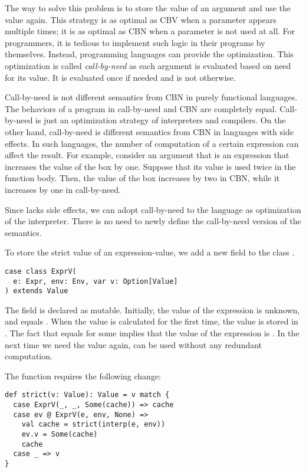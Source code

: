 The way to solve this problem is to store the value of an argument and use the
value again. This strategy is as optimal as CBV when a parameter appears
multiple times; it is as optimal as CBN when a parameter is not used at all.
For programmers, it is tedious to implement such logic in their programs by
themselves. Instead, programming languages can provide the optimization. This
optimization is called \textit{call-by-need} as each
argument is evaluated based on need for its value. It is evaluated once if
needed and is not otherwise.

Call-by-need is not different semantics from CBN in purely functional languages.
The behaviors of a program in call-by-need and CBN are completely equal.
Call-by-need is just an optimization strategy of interpreters and compilers. On
the other hand, call-by-need is different semantics from CBN in languages with
side effects. In such languages, the number of computation of a certain
expression can affect the result. For example, consider an argument that is an expression
that increases the value of the box by one. Suppose that its value is used twice
in the function body. Then, the value of the box increases by two in CBN, while
it increases by one in call-by-need.

Since \lang lacks side effects, we can adopt call-by-need to the language as
optimization of the interpreter. There is no need to newly define the call-by-need
version of the semantics.

To store the strict value of an expression-value, we add a new field to
the class .

\begin{verbatim}
case class ExprV(
  e: Expr, env: Env, var v: Option[Value]
) extends Value
\end{verbatim}

The field is declared as mutable. Initially,
the value of the expression is unknown, and  equals . When
the value is calculated for the first time, the value is stored in .
The fact that  equals  for some  implies that the
value of the expression is . In the next time we need the value again,
 can be used without any redundant computation.

The function  requires the following change:

\begin{verbatim}
def strict(v: Value): Value = v match {
  case ExprV(_, _, Some(cache)) => cache
  case ev @ ExprV(e, env, None) =>
    val cache = strict(interp(e, env))
    ev.v = Some(cache)
    cache
  case _ => v
}
\end{verbatim}


